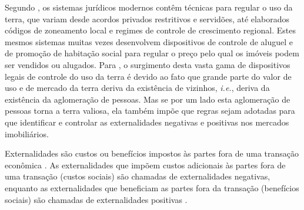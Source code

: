 \documentclass[
	12pt,				%
	oneside,			%
	a4paper,			%
	chapter=TITLE,		%
	section=TITLE,		%
	english,			%
	brazil				%
	]{abntex2}
\begin{document}
\begin{refsection}
Segundo \textcite{epstein}, os sistemas jurídicos modernos contêm técnicas para regular o
uso da terra, que variam desde acordos privados restritivos e servidões, até
elaborados códigos de zoneamento local e regimes de controle de crescimento
regional. Estes mesmos sistemas muitas vezes desenvolvem dispositivos de
controle de aluguel e de promoção de habitação social para regular o preço pelo
qual os imóveis podem ser vendidos ou alugados. Para \textcite{epstein}, o surgimento
desta vasta gama de dispositivos legais de controle do uso da terra é devido ao
fato que grande parte do valor de uso e de mercado da terra deriva da existência
de vizinhos, \emph{i.e.}, deriva da existência da aglomeração de pessoas. Mas se por
um lado esta aglomeração de pessoas torna a terra valiosa, ela também impõe que
regras sejam adotadas para que identificar e controlar as externalidades
negativas e positivas nos mercados imobiliários.

Externalidades são custos ou benefícios impostos às partes fora de uma transação
econômica . As externalidades que impõem custos adicionais às partes fora de uma
transação (custos sociais) são chamadas de externalidades negativas, enquanto as
externalidades que beneficiam as partes fora da transação (benefícios sociais)
são chamadas de externalidades positivas \autocite[p.~210-211]{externalities}.


\end{refsection}
\end{document}
